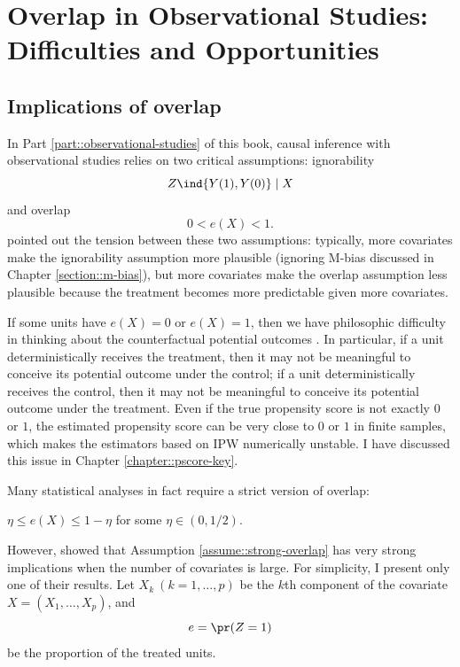 
\chapter{Overlap in Observational Studies: Difficulties and Opportunities}
  \label{chapter::overlap}


 
\section{Implications of overlap}

In Part \ref{part::observational-studies} of this book, causal inference with observational studies relies on two critical assumptions: ignorability  
$$
Z\ind \{ Y(1), Y(0)  \} \mid X
$$
 and overlap  
 $$
 0 <  e(X) <  1 .
 $$ 
 \citet{d2017overlap} pointed out the tension between these two assumptions: typically, more covariates make the ignorability assumption more plausible (ignoring M-bias discussed in Chapter \ref{section::m-bias}), but more covariates make the overlap assumption less plausible because the treatment becomes more predictable given more covariates. 

If some units have $e(X) = 0$ or $e(X) = 1$, then we have philosophic difficulty in thinking about the counterfactual potential outcomes \citep{king2006dangers}. In particular, if a unit deterministically receives the treatment, then it may not be meaningful to conceive its potential outcome under the control; if a unit deterministically receives the control, then it may not be meaningful to conceive its potential outcome under the treatment.
Even if the true propensity score is not exactly $0$ or $1$, the estimated propensity score can be very close to $0$ or $1$ in finite samples, which makes the estimators based on IPW numerically unstable. 
I have discussed this issue in Chapter \ref{chapter::pscore-key}. 


Many statistical analyses in fact require a strict version of overlap:

\begin{assumption}
\label{assume::strong-overlap}
$\eta \leq e(X) \leq 1-\eta$ for some $\eta \in (0,1/2).$
\end{assumption}


However, \citet[][Corollary 1]{d2017overlap} showed that Assumption \ref{assume::strong-overlap} has very strong implications when the number of covariates is large. For simplicity, I present only one of their results. Let $X_k\ (k=1,\ldots, p)$ be the $k$th component of the covariate $X = (X_1, \ldots, X_p)$, and 
$$
e= \pr(Z=1)
$$ 
be the proportion of the treated units. 


